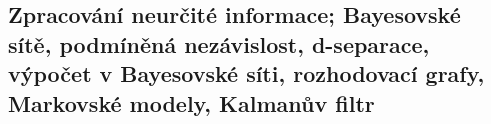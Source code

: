 \subsection{Zpracování neurčité informace; Bayesovské sítě, podmíněná nezávislost, d-separace, výpočet v Bayesovské síti, rozhodovací grafy, Markovské modely, Kalmanův filtr}